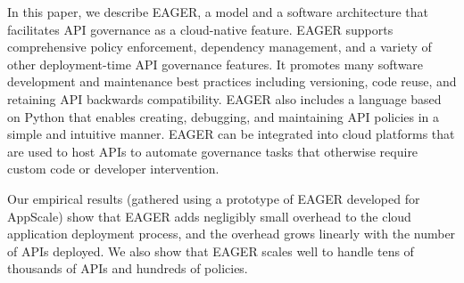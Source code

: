 In this paper, we describe EAGER, a model and a software architecture that 
facilitates API governance as a cloud-native feature. EAGER supports comprehensive policy
enforcement, dependency management, and a variety of other deployment-time API
governance features. It promotes many software development and maintenance
best practices including versioning, code reuse, and retaining API backwards
compatibility. EAGER also includes a language based on Python that enables
creating, debugging, and maintaining API policies in a simple and intuitive
manner. EAGER can be integrated into cloud platforms that are used to host APIs
to automate governance tasks that otherwise require custom code or developer intervention.

Our empirical results (gathered using a prototype of EAGER developed for AppScale)
show that EAGER adds negligibly small overhead to the cloud application 
deployment process, and the overhead grows linearly
with the number of APIs deployed. We also show that EAGER scales well 
to handle tens of thousands of APIs and hundreds of policies. 



